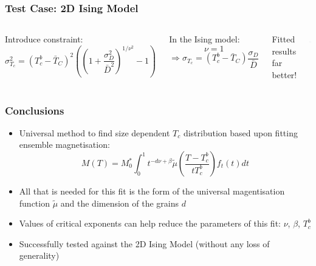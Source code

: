 \documentclass{beamer}
\begin{document}
\begin{frame}
	\frametitle{Test Case: 2D Ising Model}
	\begin{columns}
	\column{7cm}
		Introduce constraint\footnotemark[5]:
		$$
		\sigma_{T_c}^2 = (T_c^b - \bar{T}_C)^2\left(\left(1 + \frac{\sigma_D^2}{\bar{D}^2}\right)^{1/\nu^2}-1\right)
		$$

		In the Ising model:
		$$
		\nu = 1
		$$
		$$
		\Rightarrow \sigma_{T_c} = (T_c^b - \bar{T}_C)\frac{\sigma_D}{\bar{D}}
		$$
		\begin{center}\vspace{2mm}

		Fitted results far better!
		\end{center}
	\column{5cm}

		\includegraphics[width=4.5cm]{Images/constr}
	\end{columns}
\end{frame}

\begin{frame}
	\frametitle{Conclusions}
	\small{
	\begin{itemize}
		\item{Universal method to find size dependent $T_c$ distribution based upon fitting ensemble magnetisation:}
		$$
		M(T) = M_0^*\int_0^1 t^{-d\nu +\beta} \tilde{\mu}\left(\frac{T-T_c^b}{tT_c^b}\right) f_t(t) dt
		$$
		\item{All that is needed for this fit is the form of the universal magentisation function $\tilde{\mu}$ and the dimension of the grains $d$}
		\item{Values of critical exponents can help reduce the parameters of this fit: $\nu$, $\beta$, $T_c^b$}
		\item{Successfully tested against the 2D Ising Model (without any loss of generality)}
	\end{itemize}}
\end{frame}
\end{document}
